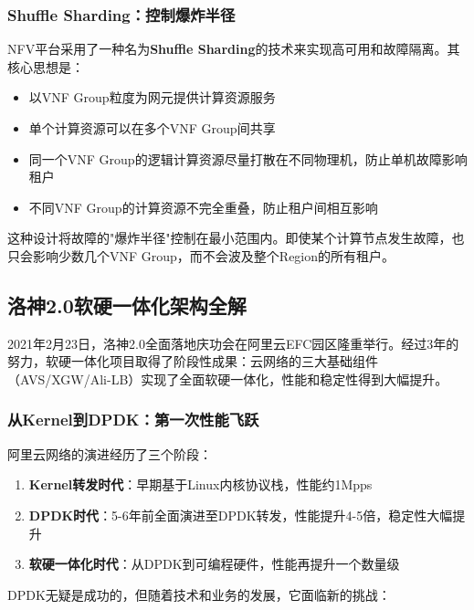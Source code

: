\subsubsection{Shuffle Sharding：控制爆炸半径}

NFV平台采用了一种名为\textbf{Shuffle Sharding}的技术来实现高可用和故障隔离。其核心思想是：

\begin{itemize}
    \item 以VNF Group粒度为网元提供计算资源服务
    \item 单个计算资源可以在多个VNF Group间共享
    \item 同一个VNF Group的逻辑计算资源尽量打散在不同物理机，防止单机故障影响租户
    \item 不同VNF Group的计算资源不完全重叠，防止租户间相互影响
\end{itemize}

这种设计将故障的"爆炸半径"控制在最小范围内。即使某个计算节点发生故障，也只会影响少数几个VNF Group，而不会波及整个Region的所有租户。

\subsection{洛神2.0软硬一体化架构全解}

2021年2月23日，洛神2.0全面落地庆功会在阿里云EFC园区隆重举行。经过3年的努力，软硬一体化项目取得了阶段性成果：云网络的三大基础组件（AVS/XGW/Ali-LB）实现了全面软硬一体化，性能和稳定性得到大幅提升。

\subsubsection{从Kernel到DPDK：第一次性能飞跃}

阿里云网络的演进经历了三个阶段：

\begin{enumerate}
    \item \textbf{Kernel转发时代}：早期基于Linux内核协议栈，性能约1Mpps
    \item \textbf{DPDK时代}：5-6年前全面演进至DPDK转发，性能提升4-5倍，稳定性大幅提升
    \item \textbf{软硬一体化时代}：从DPDK到可编程硬件，性能再提升一个数量级
\end{enumerate}

DPDK无疑是成功的，但随着技术和业务的发展，它面临新的挑战：

